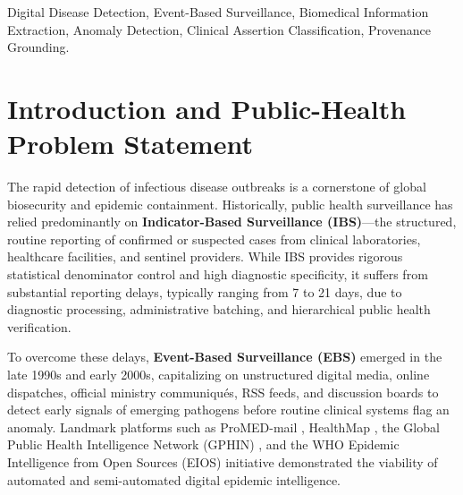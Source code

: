 \documentclass[conference]{IEEEtran}
\begin{document}
\begin{IEEEkeywords}
Digital Disease Detection, Event-Based Surveillance, Biomedical Information Extraction, Anomaly Detection, Clinical Assertion Classification, Provenance Grounding.
\end{IEEEkeywords}

\section{Introduction and Public-Health Problem Statement}
The rapid detection of infectious disease outbreaks is a cornerstone of global biosecurity and epidemic containment. Historically, public health surveillance has relied predominantly on \textbf{Indicator-Based Surveillance (IBS)}---the structured, routine reporting of confirmed or suspected cases from clinical laboratories, healthcare facilities, and sentinel providers. While IBS provides rigorous statistical denominator control and high diagnostic specificity, it suffers from substantial reporting delays, typically ranging from 7 to 21 days, due to diagnostic processing, administrative batching, and hierarchical public health verification.

To overcome these delays, \textbf{Event-Based Surveillance (EBS)} emerged in the late 1990s and early 2000s, capitalizing on unstructured digital media, online dispatches, official ministry communiqu\'es, RSS feeds, and discussion boards to detect early signals of emerging pathogens before routine clinical systems flag an anomaly. Landmark platforms such as ProMED-mail \cite{Madoff2005,Carrion2017}, HealthMap \cite{Brownstein2008,Freifeld2008}, the Global Public Health Intelligence Network (GPHIN) \cite{Mawudeku2013}, and the WHO Epidemic Intelligence from Open Sources (EIOS) initiative \cite{WHO2020} demonstrated the viability of automated and semi-automated digital epidemic intelligence.
\end{document}
